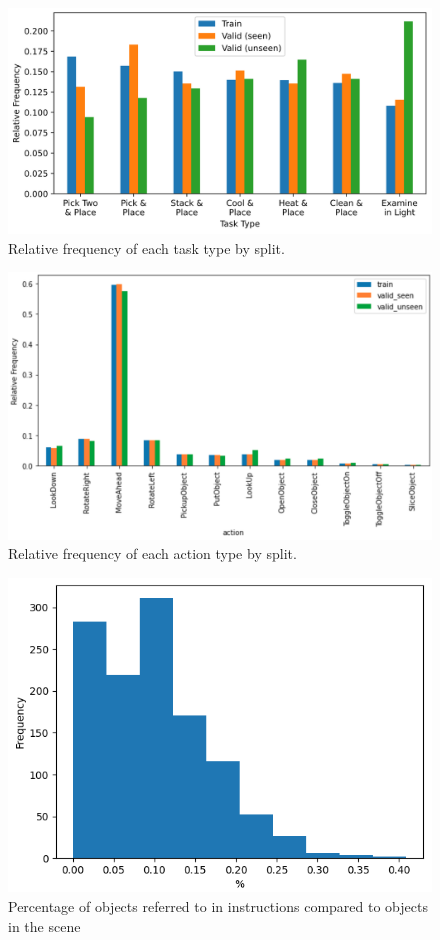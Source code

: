 \documentclass[11pt,a4paper]{article}
\begin{document}
\begin{figure}[H]
\centering
\includegraphics[scale=0.33]{figures/task_type_freqs.png}
\caption{Relative frequency of each task type by split.}
\label{fig:task-type}
\end{figure}

\begin{figure}[H]
\centering
\includegraphics[scale=0.13]{figures/action_freq.png}
\caption{Relative frequency of each action type by split.}
\label{fig:action-freq}
\end{figure}

\begin{figure}[H]
\centering
\includegraphics[scale=0.33]{figures/objects_vs_instructions.png}
\caption{Percentage of objects referred to in instructions compared to objects in the scene}
\label{fig:object-vs-instruction}
\end{figure}
\end{document}
